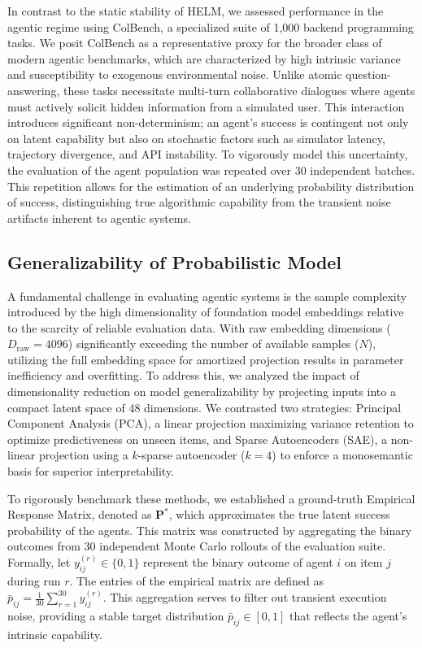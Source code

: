 \documentclass{article}
\theoremstyle{plain}
\theoremstyle{definition}
\theoremstyle{remark}
\begin{document}
In contrast to the static stability of HELM, we assessed performance in the agentic regime using ColBench, a specialized suite of 1,000 backend programming tasks. We posit ColBench as a representative proxy for the broader class of modern agentic benchmarks, which are characterized by high intrinsic variance and susceptibility to exogenous environmental noise. Unlike atomic question-answering, these tasks necessitate multi-turn collaborative dialogues where agents must actively solicit hidden information from a simulated user. This interaction introduces significant non-determinism; an agent's success is contingent not only on latent capability but also on stochastic factors such as simulator latency, trajectory divergence, and API instability. To vigorously model this uncertainty, the evaluation of the agent population was repeated over 30 independent batches. This repetition allows for the estimation of an underlying probability distribution of success, distinguishing true algorithmic capability from the transient noise artifacts inherent to agentic systems.

\subsection{Generalizability of Probabilistic Model}
\label{subsec:generalizability}

A fundamental challenge in evaluating agentic systems is the sample complexity introduced by the high dimensionality of foundation model embeddings relative to the scarcity of reliable evaluation data. With raw embedding dimensions ($D_{\text{raw}}=4096$) significantly exceeding the number of available samples ($N$), utilizing the full embedding space for amortized projection results in parameter inefficiency and overfitting. To address this, we analyzed the impact of dimensionality reduction on model generalizability by projecting inputs into a compact latent space of 48 dimensions. We contrasted two strategies: Principal Component Analysis (PCA), a linear projection maximizing variance retention to optimize predictiveness on unseen items, and Sparse Autoencoders (SAE), a non-linear projection using a $k$-sparse autoencoder ($k=4$) to enforce a monosemantic basis for superior interpretability.

To rigorously benchmark these methods, we established a ground-truth Empirical Response Matrix, denoted as $\mathbf{P}^*$, which approximates the true latent success probability of the agents. This matrix was constructed by aggregating the binary outcomes from 30 independent Monte Carlo rollouts of the evaluation suite. Formally, let $y_{ij}^{(r)} \in \{0, 1\}$ represent the binary outcome of agent $i$ on item $j$ during run $r$. The entries of the empirical matrix are defined as $\bar{p}_{ij} = \frac{1}{30} \sum_{r=1}^{30} y_{ij}^{(r)}$. This aggregation serves to filter out transient execution noise, providing a stable target distribution $\bar{p}_{ij} \in [0, 1]$ that reflects the agent's intrinsic capability.
\end{document}
